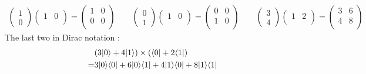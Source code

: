 \documentclass[12pt]{article}
\theoremstyle{exostyle}
\begin{document}
\begin{align*}
\left(\begin{array}{c}
 1\\
 0
\end{array}\right)
\left(\begin{array}{cccc}
 1 &0 \\
\end{array}\right)
=
\left(\begin{array}{cccc}
 1 &0 \\
 0 &0 \\
\end{array}\right)
\qquad
\left(\begin{array}{c}
 0\\
 1
\end{array}\right)
\left(\begin{array}{cccc}
 1 &0 \\
\end{array}\right)
=
\left(\begin{array}{cccc}
 0 &0 \\
 1 &0 \\
\end{array}\right)
\qquad
\left(\begin{array}{c}
 3\\
 4
\end{array}\right)
\left(\begin{array}{cccc}
 1 &2 \\
\end{array}\right)
=
\left(\begin{array}{cccc}
 3 &6 \\
 4 &8 \\
\end{array}\right)
\end{align*}
The last two in Dirac notation :
\begin{align*}
  & (3| 0 \rangle + 4| 1 \rangle) \times (\langle 0 | + 2\langle 1 |) \\
  =& 3 | 0 \rangle \langle 0 | + 6 | 0 \rangle \langle 1 | + 4 | 1 \rangle \langle 0 | + 8 | 1 \rangle \langle 1 |
\end{align*}
\end{document}
